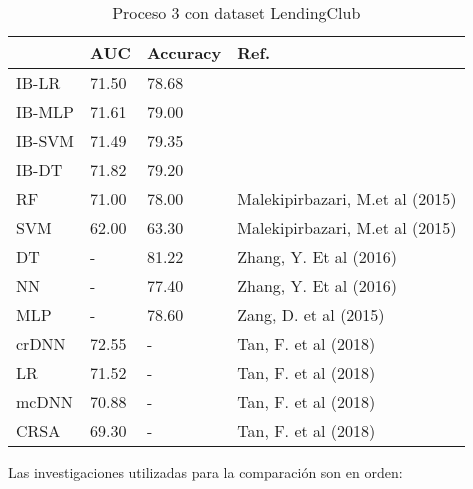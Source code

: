 \begin{table}[]
\centering
\caption{Proceso 3 con dataset LendingClub}
\label{tab:lc-proc3}
\begin{tabularx}{\textwidth}{|l|Y Y l|}
                \hline
                & AUC           & Accuracy      & Ref.                                  \\
                \hline
IB-LR           & 71.50         & 78.68         &                                       \\
IB-MLP          & 71.61         & 79.00         &                                       \\
IB-SVM          & 71.49         & 79.35         &                                       \\
IB-DT           & 71.82         & 79.20         &                                       \\
                \hline
RF              & 71.00         & 78.00         & Malekipirbazari, M.et al (2015)       \\
SVM             & 62.00         & 63.30         & Malekipirbazari, M.et al (2015)       \\
DT              & -             & 81.22         & Zhang, Y. Et al (2016)                \\
NN              & -             & 77.40         & Zhang, Y. Et al (2016)                \\
MLP             & -             & 78.60         & Zang, D. et al (2015)                 \\
crDNN           & 72.55         & -             & Tan, F. et al (2018)                  \\
LR              & 71.52         & -             & Tan, F. et al (2018)                  \\
mcDNN           & 70.88         & -             & Tan, F. et al (2018)                  \\
CRSA            & 69.30         & -             & Tan, F. et al (2018)                  \\
                \hline
\end{tabularx}
\par
\small
Las investigaciones utilizadas para la comparación son en orden: \cite{malekipirbazari2015risk, zhang2016research, zang2014credit, tan2018deep}
\end{table}



